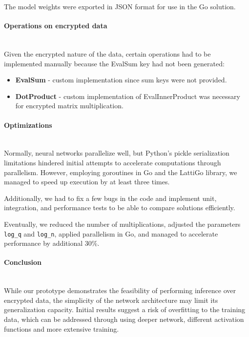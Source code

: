 \documentclass[article]{iacrtrans}
\begin{document}
The model weights were exported in JSON format for use in the Go solution.

\paragraph{Operations on encrypted data}\mbox{}\\

Given the encrypted nature of the data, certain operations had to be implemented manually because the EvalSum key had not been generated:

\begin{itemize}
    \item \textbf{EvalSum} - custom implementation since sum keys were not provided.
    \item \textbf{DotProduct} - custom implementation of EvalInnerProduct was necessary for encrypted matrix multiplication.
\end{itemize}

\paragraph{Optimizations}\mbox{}\\

Normally, neural networks parallelize well, but Python's pickle serialization limitations hindered initial attempts to accelerate computations through parallelism. However, employing goroutines in Go and the LattiGo library, we managed to speed up execution by at least three times.

Additionally, we had to fix a few bugs in the code and implement unit, integration, and performance tests to be able to compare solutions efficiently.

Eventually, we reduced the number of multiplications, adjusted the parameters \verb|log_q| and \verb|log_n|, applied parallelism in Go, and managed to accelerate performance by additional 30\%.

\paragraph{Conclusion}\mbox{}\\

While our prototype demonstrates the feasibility of performing inference over encrypted data, the simplicity of the network architecture may limit its generalization capacity. Initial results suggest a risk of overfitting to the training data, which can be addressed through using deeper network, different activation functions and more extensive training.
 
\end{document}

